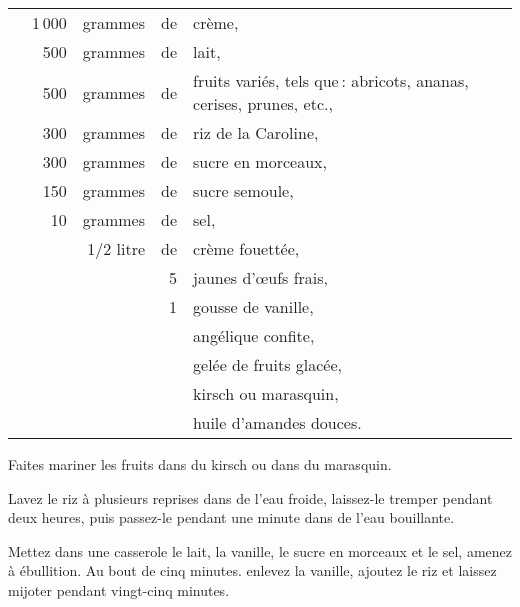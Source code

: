 \footnotesize
\begin{longtable}{rrrrp{16em}}
  &   1 000 & grammes & de & crème,                                                                       \\
  &     500 & grammes & de & lait,                                                                        \\
  &     500 & grammes & de & fruits variés, tels que : abricots, ananas, cerises, prunes, etc.,           \\
  &     300 & grammes & de & riz de la Caroline,                                                          \\
  &     300 & grammes & de & sucre en morceaux,                                                           \\
  &     150 & grammes & de & sucre semoule,                                                               \\
  &      10 & grammes & de & sel,                                                                         \\
  & \multicolumn{2}{r}{1/2 litre} & de & crème fouettée,                                                  \\
  &         &         &  5 & jaunes d'œufs frais,                                                         \\
  &         &         &  1 & gousse de vanille,                                                           \\
  &         &         &    & angélique confite,                                                           \\
  &         &         &    & gelée de fruits glacée,                                                      \\
  &         &         &    & kirsch ou marasquin,                                                         \\
  &         &         &    & huile d'amandes douces.                                                      \\
\end{longtable}
\normalsize

Faites mariner les fruits dans du kirsch ou dans du marasquin.

Lavez le riz à plusieurs reprises dans de l'eau froide, laissez-le tremper
pendant deux heures, puis passez-le pendant une minute dans de l’eau
bouillante.

Mettez dans une casserole le lait, la vanille, le sucre en morceaux et le sel,
amenez à ébullition. Au bout de cinq minutes. enlevez la vanille, ajoutez le
riz et laissez mijoter pendant vingt-cinq minutes.

